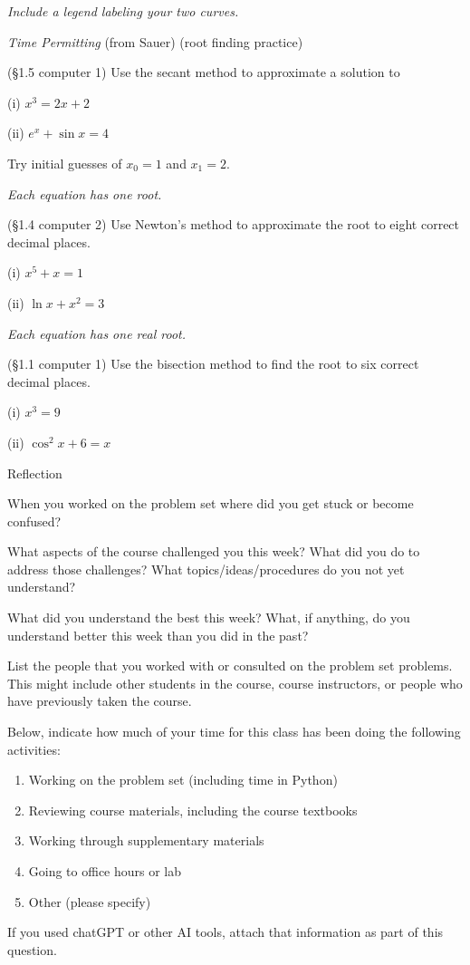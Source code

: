 \documentclass[12pt,letterpaper,noanswers]{exam}
\begin{document}
\begin{questions}
\begin{parts}
\emph{Include a legend labeling your two curves.}
\end{parts}






\item \emph{Time Permitting} (from Sauer) (root finding practice)
\begin{parts}
\item (\S1.5 computer 1) Use the secant method to approximate a solution to 

(i) $x^3=2x+2$

(ii) $e^x +\sin x=4$

Try initial guesses of $x_0=1$ and $x_1=2$.

\emph{Each equation has one root.}

\item (\S1.4 computer 2) Use Newton's method to approximate the root to eight correct decimal places.

(i) $x^5 + x = 1$

(ii) $\ln x + x^2 = 3$

\emph{Each equation has one real root.}

\item (\S 1.1 computer 1) Use the bisection method to find the root to six correct decimal places.

(i) $x^3 = 9$

(ii) $\cos^2 x + 6 = x$
\end{parts}


\question Reflection
\begin{parts}
\item When you worked on the problem set where did you get stuck or become confused?
\item What aspects of the course challenged you this week?  What did you do to address those challenges?  What topics/ideas/procedures do you not yet understand?
\item What did you understand the best this week?  What, if anything, do you understand better this week than you did in the past?
\item List the people that you worked with or consulted on the problem set problems.  This might include other students in the course, course instructors, or people who have previously taken the course.
\item Below, indicate how much of your time for this class has been doing the following activities:
	\begin{enumerate}
	\item Working on the problem set (including time in Python)
	\item Reviewing course materials, including the course textbooks
	\item Working through supplementary materials
	\item Going to office hours or lab
	\item Other (please specify)
	\end{enumerate}
\item If you used chatGPT or other AI tools, attach that information as part of this question.
\end{parts}
\end{questions}



\end{document}
